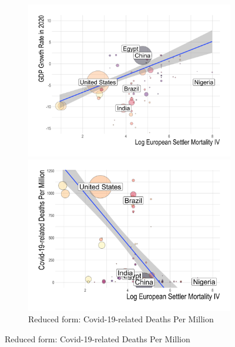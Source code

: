 \begin{figure}[htb]
\begin{subfigure}[c]{.49\linewidth}
\end{subfigure}
\begin{subfigure}[c]{.49\linewidth}
    \centering
    \includegraphics[width=.99\textwidth]{plots/figure2c.png}
    \caption{Reduced form: GDP Growth Rate in 2020}\label{fig:reduced-gdp-logem}
    
    \includegraphics[width=.99\textwidth]{plots/figure2d.png}
    \caption{Reduced form: Covid-19-related Deaths Per Million}\label{fig:reduced-deaths-logem}
    
\end{subfigure}


\end{figure}
